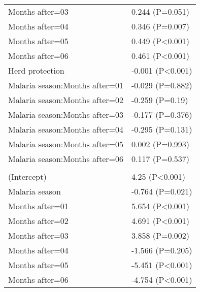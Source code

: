 \documentclass[]{article}
\begin{document}
\begin{longtable}[t]{ll}
\hspace{1em}Months after=03 & 0.244 (P=0.051)\\
\hspace{1em}Months after=04 & 0.346 (P=0.007)\\
\hspace{1em}Months after=05 & 0.449 (P<0.001)\\
\hspace{1em}Months after=06 & 0.461 (P<0.001)\\
\hspace{1em}Herd protection & -0.001 (P<0.001)\\
\hspace{1em}Malaria season:Months after=01 & -0.029 (P=0.882)\\
\hspace{1em}Malaria season:Months after=02 & -0.259 (P=0.19)\\
\hspace{1em}Malaria season:Months after=03 & -0.177 (P=0.376)\\
\hspace{1em}Malaria season:Months after=04 & -0.295 (P=0.131)\\
\hspace{1em}Malaria season:Months after=05 & 0.002 (P=0.993)\\
\hspace{1em}Malaria season:Months after=06 & 0.117 (P=0.537)\\
\addlinespace[1.5em]
\multicolumn{2}{l}{\textbf{Temporary not field worker}}\\
\hspace{1em}(Intercept) & 4.25 (P<0.001)\\
\hspace{1em}Malaria season & -0.764 (P=0.021)\\
\hspace{1em}Months after=01 & 5.654 (P<0.001)\\
\hspace{1em}Months after=02 & 4.691 (P<0.001)\\
\hspace{1em}Months after=03 & 3.858 (P=0.002)\\
\hspace{1em}Months after=04 & -1.566 (P=0.205)\\
\hspace{1em}Months after=05 & -5.451 (P<0.001)\\
\hspace{1em}Months after=06 & -4.754 (P<0.001)\\

\end{longtable}
\end{document}
